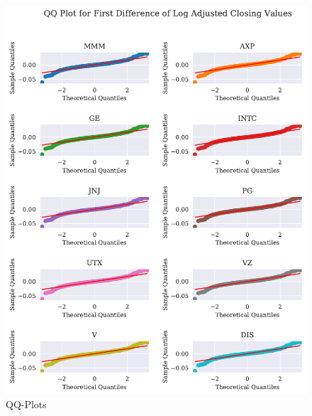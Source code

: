 \begin{figure}[h]
    \centering
    \begin{adjustbox}{width=.9\textwidth,center}
    \includegraphics[]{figures/all_qq_plot_fd_log_adjclose.pdf}
    \end{adjustbox}  
    \caption{QQ-Plots}
    \label{fig:all_qq_fd_log_adjclose}
\end{figure}{}
